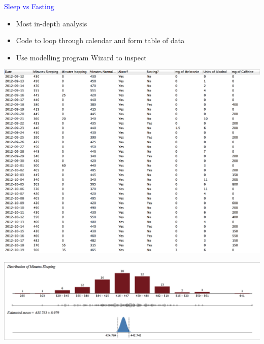 \documentclass[landscape]{slides}
\begin{document}
\begin{slide}
    \textcolor{blue}{\Large{Sleep vs Fasting}}

    \begin{itemize}
        \item Most in-depth analysis
        \item Code to loop through calendar and form table of data
        \item Use modelling program Wizard to inspect
    \end{itemize}

\end{slide}

\begin{slide}
    \includegraphics[width=\textwidth]{sleep-analysis-table}
\end{slide}

\begin{slide}
    \includegraphics[width=\textwidth]{sleep-analysis-distribution}
\end{slide}
\end{document}

